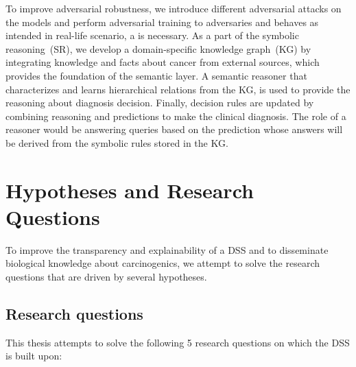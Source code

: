 \hspace*{3.5mm} To improve adversarial robustness, we introduce different adversarial attacks on the models and perform adversarial training to adversaries and behaves as intended in real-life scenario, a is necessary. As a part of the symbolic reasoning~(SR), we develop a domain-specific knowledge graph~(KG) by integrating knowledge and facts about cancer from external sources, which provides the foundation of the semantic layer. A semantic reasoner that characterizes and learns hierarchical relations from the KG, is used to provide the reasoning about diagnosis decision. 
Finally, decision rules are updated by combining reasoning and predictions to make the clinical diagnosis. The role of a reasoner would be answering queries based on the prediction whose answers will be derived from the symbolic rules stored in the KG.  

\section{Hypotheses and Research Questions} \label{hypotheses}
To improve the transparency and explainability of a DSS and to disseminate biological knowledge about carcinogenics, we attempt to solve the research questions that are driven by several hypotheses.  

\subsection{Research questions}
This thesis attempts to solve the following 5 research questions on which the DSS is built upon:  

